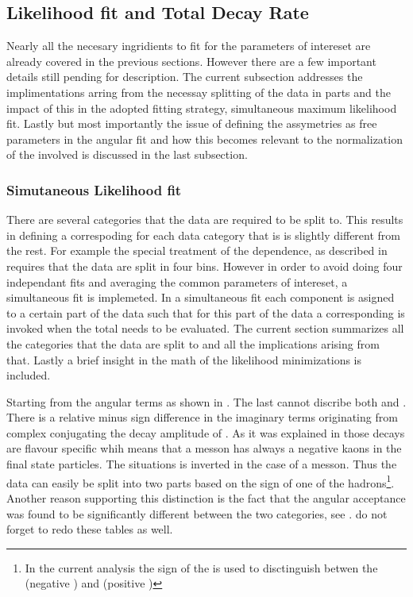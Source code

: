 \subsection{Likelihood fit and Total Decay Rate}
\label{Total_Decay_Rate}

Nearly all the necesary ingridients to fit for the parameters of intereset are already covered in the previous sections.
However there are a few important details still pending for description. The current subsection addresses the 
implimentations arring from the necessay splitting of the data in parts and the impact of this in the adopted
fitting strategy, simultaneous maximum likelihood fit. Lastly but most importantly the issue of defining the \ACP 
assymetries as free parameters in the angular fit and how this becomes relevant to the normalization of the \pdfs
involved is discussed in the last subsection.

\subsubsection{Simutaneous Likelihood fit}
\label{Simutaneous_Likelihood_ fit}
There are several categories that the data are required to be split to. This results in defining a correspoding \pdf
for each data category that is is slightly different from the rest. For example the special treatment of the \mkpi dependence,
as described in  requires that the data are split in four \mkpi bins. However in order to avoid doing
four independant fits and averaging the common parameters of intereset, a simultaneous fit is implemeted. In a simultaneous fit 
each component \pdf is asigned to a certain part of the data such that for this part of the data a corresponding \pdf is invoked
when the total \pdf needs to be evaluated.  The current section summarizes all the categories that the data are split to and all 
the implications arising from that. Lastly a brief insight in the math of the likelihood minimizations is included. 

Starting from the angular \pdf terms as shown in . The last cannot discribe both \BsJpsiKst and \BsbarJpsiKst. 
There is a relative minus sign difference in the imaginary terms originating from complex conjugating the decay amplitude of 
\BsJpsiKst. As it was explained in  those decays are flavour specific whih means that a \Bs messon
has always a negative kaons in the final state particles. The situations is inverted in the case of a \Bsb messon.
Thus the data can easily be split into two parts based on the sign of one of the hadrons\footnote{In the current analysis the sign
of the \kaon is used to disctinguish betwen the \BsJpsiKst (negative \kaon) and \BsbarJpsiKst (positive \kaon) }.
Another reason supporting this distinction is the fact that the angular acceptance was found to be significantly different between
the two categories, see \tabref{}. {\color{red} do not forget to redo these tables as well.}


